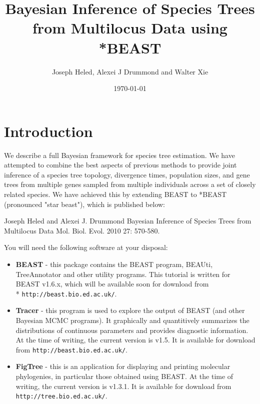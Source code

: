 \documentclass[12pt]{article}
\begin{document}
\title{Bayesian Inference of Species Trees from Multilocus Data using *BEAST }

\author{Joseph Heled, Alexei J Drummond and Walter Xie}

\date{\today{}}

\maketitle

\section*{Introduction}

We describe a full Bayesian framework for species tree estimation. We have attempted to combine the best aspects of previous methods to provide joint inference of a species tree topology, divergence times, population sizes, and gene trees from multiple genes sampled from multiple individuals across a set of closely related species. We have achieved this by extending BEAST to *BEAST (pronounced "star beast"), which is published below:

Joseph Heled and Alexei J. Drummond
Bayesian Inference of Species Trees from Multilocus Data
Mol. Biol. Evol. 2010 27: 570-580. 

You will need the following software at your disposal:

\begin{itemize}

\item {\bf BEAST} - this package contains the BEAST program, BEAUti, TreeAnnotator and other utility programs. This tutorial is written for BEAST v1.6.x, which will be available soon for download from \\* \texttt{http://beast.bio.ed.ac.uk/}.
\item {\bf Tracer} - this program is used to explore the output of BEAST (and other Bayesian MCMC programs). It graphically and
quantitively summarizes the distributions of continuous parameters and provides diagnostic information. At the time of
writing, the current version is v1.5. It is available for download from \texttt{http://beast.bio.ed.ac.uk/}.
\item {\bf FigTree} - this is an application for displaying and printing molecular phylogenies, in particular those obtained using
BEAST. At the time of writing, the current version is v1.3.1. It is available for download from \texttt{http://tree.bio.ed.ac.uk/}.
\end{itemize}
\end{document}
